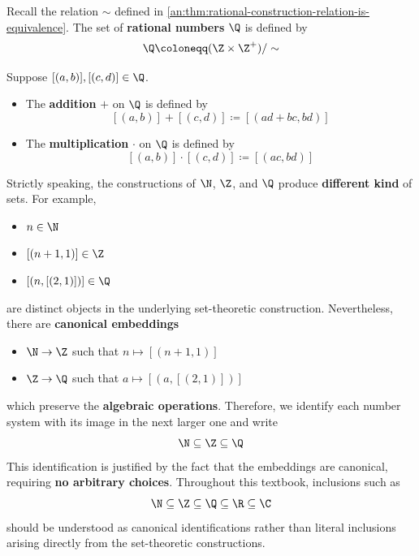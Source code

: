 \bigskip

\begin{definition} \label{an:def:rational-number-system}
  Recall the relation $\sim$ defined in \cref{an:thm:rational-construction-relation-is-equivalence}.
  The set of \textbf{rational numbers} $\Q$ is defined by
  \[
    \Q \coloneqq (\Z \times \Z^{+}) / \sim
  \]
\end{definition}

\bigskip

\begin{definition} \label{an:def:operations-on-Q}
  Suppose $[(a, b)], [(c, d)] \in \Q$.
  \begin{itemize}
    \item The \textbf{addition} $+$ on $\Q$ is defined by
          \[
            [(a, b)] + [(c, d)] \coloneqq [(ad + bc, bd)]
          \]
    \item The \textbf{multiplication} $\cdot$ on $\Q$ is defined by
          \[
            [(a, b)] \cdot [(c, d)] \coloneqq [(ac, bd)]
          \]
  \end{itemize}
\end{definition}

\bigskip

\begin{remark}
  Strictly speaking, the constructions of $\N$, $\Z$, and $\Q$
  produce \textbf{different kind} of sets. For example,
  \begin{itemize}
    \item $n \in \N$
    \item $[(n + 1, 1)] \in \Z$
    \item $[(n, [(2, 1)])] \in \Q$
  \end{itemize}
  are distinct objects in the underlying set-theoretic construction.
  Nevertheless, there are \textbf{canonical embeddings}
  \begin{itemize}
    \item $\N \to \Z$ such that $n \mapsto [(n + 1, 1)]$
    \item $\Z \to \Q$ such that $a \mapsto [(a, [(2, 1)])]$
  \end{itemize}
  which preserve the \textbf{algebraic operations}. Therefore, we identify
  each number system with its image in the next larger one and write
  \[
    \N \subseteq \Z \subseteq \Q
  \]
  This identification is justified by the fact that the embeddings are canonical,
  requiring \textbf{no arbitrary choices}. Throughout this textbook, inclusions such as
  \[
    \N \subseteq \Z \subseteq \Q \subseteq \R \subseteq \C
  \]
  should be understood as canonical identifications rather than
  literal inclusions arising directly from the set-theoretic constructions.
\end{remark}

